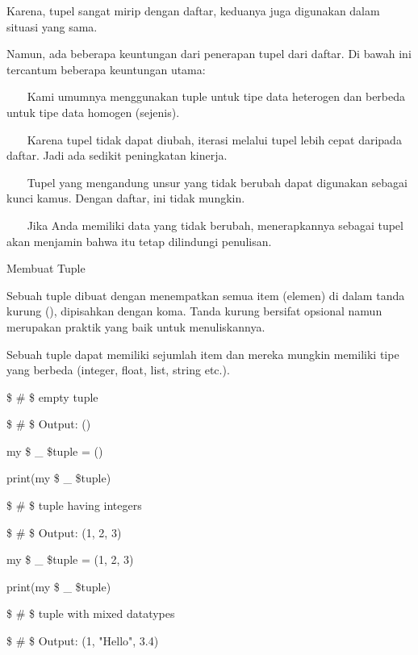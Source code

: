 Karena, tupel sangat mirip dengan daftar, keduanya juga digunakan dalam situasi yang sama. \par
\vspace{12pt}
Namun, ada beberapa keuntungan dari penerapan tupel dari daftar. Di bawah ini tercantum beberapa keuntungan utama: \par
\vspace{12pt}
~~~ Kami umumnya menggunakan tuple untuk tipe data heterogen dan berbeda untuk tipe data homogen (sejenis). \par
~~~ Karena tupel tidak dapat diubah, iterasi melalui tupel lebih cepat daripada daftar. Jadi ada sedikit peningkatan kinerja. \par
~~~ Tupel yang mengandung unsur yang tidak berubah dapat digunakan sebagai kunci kamus. Dengan daftar, ini tidak mungkin. \par
~~~ Jika Anda memiliki data yang tidak berubah, menerapkannya sebagai tupel akan menjamin bahwa itu tetap dilindungi penulisan. \par
\vspace{12pt}
Membuat Tuple \par
\vspace{12pt}
Sebuah tuple dibuat dengan menempatkan semua item (elemen) di dalam tanda kurung (), dipisahkan dengan koma. Tanda kurung bersifat opsional namun merupakan praktik yang baik untuk menuliskannya. \par
\vspace{12pt}
Sebuah tuple dapat memiliki sejumlah item dan mereka mungkin memiliki tipe yang berbeda (integer, float, list, string etc.). \par
\vspace{12pt}
\vspace{12pt}
 \$  \#  \$ empty tuple \par
 \$  \#  \$ Output: () \par
my \$  \_  \$tuple = () \par
print(my \$  \_  \$tuple) \par
\vspace{12pt}
 \$  \#  \$ tuple having integers \par
 \$  \#  \$ Output: (1, 2, 3) \par
my \$  \_  \$tuple = (1, 2, 3) \par
print(my \$  \_  \$tuple) \par
\vspace{12pt}
 \$  \#  \$ tuple with mixed datatypes \par
 \$  \#  \$ Output: (1, "Hello", 3.4) \par
